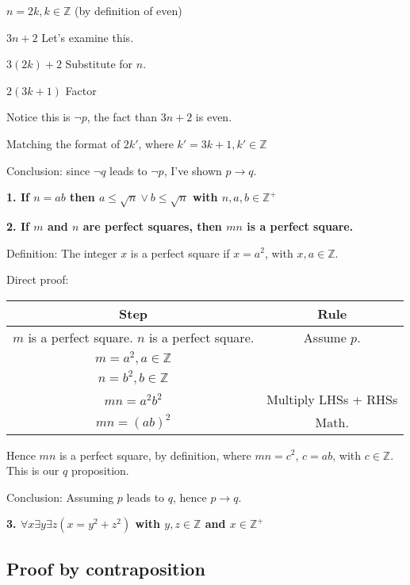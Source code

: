 \documentclass[english,openany]{book}
\begin{document}
	$n = 2k, k \in {\mathbb Z}$ (by definition of even)

	$3n+2$ Let's examine this.

	$3(2k) + 2$ Substitute for $n$.

	$2(3k+1)$ Factor

	Notice this is $\neg p$, the fact than $3n+2$ is even.

	Matching the format of $2k'$, where $k' = 3k+1, k' \in \mathbb Z$

	Conclusion: since $\neg q$ leads to $\neg p$, I've shown $p \rightarrow q$.

		\textbf{1. If $n = ab$ then $a \leq \sqrt{n} \lor b \leq \sqrt{n}$ with $n, a, b \in \mathbb Z^+$}

	\textbf{2. If $m$ and $n$ are perfect squares, then $mn$ is a perfect square.}

	Definition: The integer $x$ is a perfect square if $x = a^2$, with $x, a \in \mathbb Z$.

	Direct proof:

	\begin{tabular}{c|c}
		Step&Rule\\
		\hline
		$m$ is a perfect square. $n$ is a perfect square. &Assume $p$.\\

		$m = a^2, a \in \mathbb Z$&\\

		$n = b^2, b \in \mathbb Z$&\\

		$mn = a^2 b^2$ &Multiply LHSs + RHSs\\

		$mn = (ab)^2$ &Math.\\
	\end{tabular}

	Hence $mn$ is a perfect square, by definition, where $mn = c^2$, $c=ab$, with $c \in \mathbb Z$. This is our $q$ proposition.

	Conclusion: Assuming $p$ leads to $q$, hence $p \rightarrow q$.\newline

	\textbf{3. $\forall x \exists y \exists z (x=y^2 + z^2)$ with $y,z \in \mathbb Z$ and $x \in \mathbb Z^+$}

	\subsection{Proof by contraposition}
\end{document}
